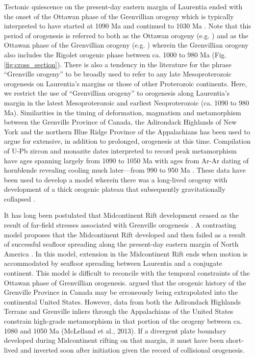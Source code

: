 \documentclass[11pt,letterpaper]{article}
\begin{document}
Tectonic quiescence on the present-day eastern margin of Laurentia ended with the onset of the Ottawan phase of the Grenvillian orogeny which is typically interpreted to have started at 1090 Ma and continued to 1030 Ma \citep{McLelland2001a}. Note that this period of orogenesis is referred to both as the Ottawan orogeny (e.g. \citealp{McLelland2001a}) and as the Ottawan phase of the Grenvillian orogeny (e.g. \citealp{Rivers2008a}) wherein the Grenvillian orogeny also includes the Rigolet orogenic phase between ca. 1000 to 980 Ma (Fig. \ref{fig:cross_section}). There is also a tendency in the literature for the phrase ``Grenville orogeny'' to be broadly used to refer to any late Mesoproterozoic orogenesis on Laurentia's margins or those of other Proterozoic continents. Here, we restrict the use of ``Grenvillian orogeny'' to orogenesis along Laurentia's margin in the latest Mesoproterozoic and earliest Neoproterozoic (ca. 1090 to 980 Ma). Similarities in the timing of deformation, magmatism and metamorphism between the Grenville Province of Canada, the Adirondack Highlands of New York and the northern Blue Ridge Province of the Appalachians has been used to argue for extensive, in addition to prolonged, orogenesis at this time. Compilation of U-Pb zircon and monazite dates interpreted to record peak metamorphism have ages spanning largely from 1090 to 1050 Ma with ages from Ar-Ar dating of hornblende revealing cooling much later---from 990 to 950 Ma \citep{Rivers2008a}. These data have been used to develop a model wherein there was a long-lived orogeny with development of a thick orogenic plateau that subsequently gravitationally collapsed \citep{Rivers2008a}.

It has long been postulated that Midcontinent Rift development ceased as the result of far-field stresses associated with Grenville orogenesis \citep{Cannon1992a}. A contrasting model proposes that the Midcontinent Rift developed and then failed as a result of successful seafloor spreading along the present-day eastern margin of North America \citep{Stein2014a}. In this model, extension in the Midcontinent Rift ends when motion is accommodated by seafloor spreading between Laurentia and a conjugate continent. This model is difficult to reconcile with the temporal constraints of the Ottawan phase of Grenvillian orogenesis. \cite{Stein2014a} argued that the orogenic history of the Grenville Province in Canada may be erroneously being extrapolated into the continental United States. However, data from both the Adirondack Highlands Terrane and Grenville inliers through the Appalachians of the United States constrain high-grade metamorphism in that portion of the orogeny between ca. 1080 and 1050 Ma (McLelland et al., 2013). If a divergent plate boundary developed during Midcontinent rifting on that margin, it must have been short-lived and inverted soon after initiation given the record of collisional orogenesis.
\end{document}
